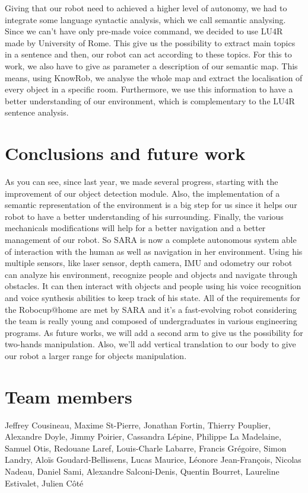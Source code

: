 \documentclass[runningheads,a4paper]{llncs}
\begin{document}
Giving that our robot need to achieved a higher level of autonomy, we had to integrate some language syntactic analysis, which we call semantic analysing. Since we can't have only pre-made voice command, we decided to use LU4R \cite{lu4r} made by University of Rome. This give us the possibility to extract main topics in a sentence and then, our robot can act according to these topics. For this to work, we also have to give as parameter a description of our semantic map. This means, using KnowRob, we analyse the whole map and extract the localisation of every object in a specific room. Furthermore, we use this information to have a better understanding of our environment, which is complementary to the LU4R sentence analysis.


\section{Conclusions and future work}
\tab As you can see, since last year, we made several progress, starting with the improvement of our object detection module. Also, the implementation of a semantic representation of the environment is a big step for us since it helps our robot to have a better understanding of his surrounding. Finally, the various mechanicals modifications will help for a better navigation and a better management of our robot. So SARA is now a complete autonomous system able of interaction with the human as well as navigation in her environment. Using his multiple sensors, like laser sensor, depth camera, IMU and odometry our robot can analyze his environment, recognize people and objects and navigate through obstacles. It can then interact with objects and people using his voice recognition and voice synthesis abilities to keep track of his state. All of the requirements for the Robocup@home are met by SARA and it's a fast-evolving robot considering the team is really young and composed of undergraduates in various engineering programs. As future works, we will add a second arm to give us the possibility for two-hands manipulation. Also, we'll add vertical translation to our body to give our robot a larger range for objects manipulation.


	

\section*{Team members}
Jeffrey Cousineau, Maxime St-Pierre, Jonathan Fortin, Thierry Pouplier, Alexandre Doyle, Jimmy Poirier, Cassandra Lépine, Philippe La Madelaine, Samuel Otis, Redouane Laref, Louis-Charle Labarre, Francis Grégoire, Simon Landry, Aloïs Goudard-Bellissens, Lucas Maurice, Léonore Jean-François, Nicolas Nadeau, Daniel Sami, Alexandre Salconi-Denis, Quentin Bourret, Laureline Estivalet, Julien Côté 

\nocite{*}


\end{document}
